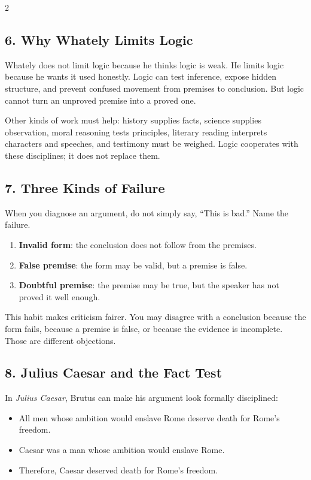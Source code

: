 \documentclass[12pt]{article}
\begin{document}
\begin{multicols}{2}
\subsection*{6. Why Whately Limits Logic}
Whately does not limit logic because he thinks logic is weak. He limits logic because he wants it used honestly. Logic can test inference, expose hidden structure, and prevent confused movement from premises to conclusion. But logic cannot turn an unproved premise into a proved one.

Other kinds of work must help: history supplies facts, science supplies observation, moral reasoning tests principles, literary reading interprets characters and speeches, and testimony must be weighed. Logic cooperates with these disciplines; it does not replace them.

\subsection*{7. Three Kinds of Failure}
When you diagnose an argument, do not simply say, ``This is bad.'' Name the failure.

\begin{enumerate}[leftmargin=*]
\item \textbf{Invalid form}: the conclusion does not follow from the premises.
\item \textbf{False premise}: the form may be valid, but a premise is false.
\item \textbf{Doubtful premise}: the premise may be true, but the speaker has not proved it well enough.
\end{enumerate}

This habit makes criticism fairer. You may disagree with a conclusion because the form fails, because a premise is false, or because the evidence is incomplete. Those are different objections.

\subsection*{8. Julius Caesar and the Fact Test}
In \textit{Julius Caesar}, Brutus can make his argument look formally disciplined:
\begin{itemize}[leftmargin=*]
\item All men whose ambition would enslave Rome deserve death for Rome's freedom.
\item Caesar was a man whose ambition would enslave Rome.
\item Therefore, Caesar deserved death for Rome's freedom.
\end{itemize}


\end{multicols}
\end{document}
